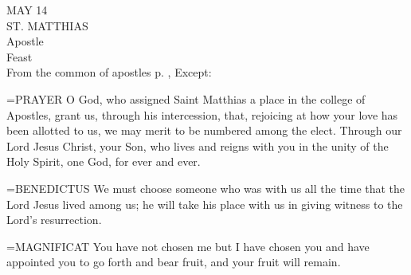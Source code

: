 \begin{center}\normalsize MAY 14\\
\footnotesize ST. MATTHIAS\\
\footnotesize Apostle\\
\footnotesize Feast\\
\footnotesize From the common of apostles p.    , Except:\\
\end{center}

\hangindent=\parindent \small{PRAYER 
O God, who assigned Saint Matthias
a place in the college of Apostles,
grant us, through his intercession,
that, rejoicing at how your love has been allotted to us,
we may merit to be numbered among the elect.
Through our Lord Jesus Christ, your Son,
who lives and reigns with you in the unity of the Holy Spirit,
one God, for ever and ever.\\}
 
\hangindent=\parindent \small{BENEDICTUS  We must choose someone who was with us all the time
that the Lord Jesus lived among us; he will take his place with us in
giving witness to the Lord’s resurrection.\\}
 
\hangindent=\parindent \small{MAGNIFICAT  You have not chosen me but I have chosen you and have
appointed you to go forth and bear fruit, and your fruit will remain.\\}
 

